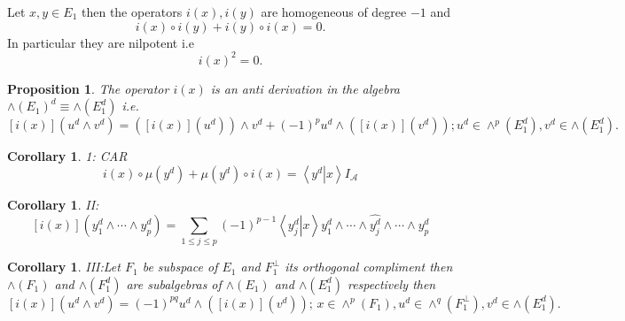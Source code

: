 \documentclass[aps,preprint]{revtex4}%
\newtheorem{corollary}[theorem]{Corollary}
\newtheorem{proposition}[theorem]{Proposition}
\begin{document}
Let $x,y\in E_{1}$ then the operators $i\left(  x\right)  ,i\left(  y\right)
$ are homogeneous of degree $-1$ and
\begin{equation}
i\left(  x\right)  \circ i\left(  y\right)  +i\left(  y\right)  \circ i\left(
x\right)  =0.
\end{equation}
In particular they are nilpotent i.e
\begin{equation}
i\left(  x\right)  ^{2}=0.
\end{equation}


\begin{proposition}
The operator $i\left(  x\right)  $ is an anti derivation in the algebra
$\wedge\left(  E_{1}\right)  ^{d}\equiv\wedge\left(  E_{1}^{d}\right)  $ i.e.
\begin{equation}
\left[  i\left(  x\right)  \right]  \left(  u^{d}\wedge v^{d}\right)  =\left(
\left[  i\left(  x\right)  \right]  \left(  u^{d}\right)  \right)  \wedge
v^{d}+\left(  -1\right)  ^{p}u^{d}\wedge\left(  \left[  i\left(  x\right)
\right]  \left(  v^{d}\right)  \right)  ;u^{d}\in\wedge^{p}\left(  E_{1}%
^{d}\right)  ,v^{d}\in\wedge\left(  E_{1}^{d}\right)  .
\end{equation}

\end{proposition}

\begin{corollary}
1: CAR%
\begin{equation}
i\left(  x\right)  \circ\mu\left(  y^{d}\right)  +\mu\left(  y^{d}\right)
\circ i\left(  x\right)  =\left\langle \left.  y^{d}\right\vert x\right\rangle
I_{\mathcal{A}}%
\end{equation}

\end{corollary}

\begin{corollary}
II:%
\begin{equation}
\left[  i\left(  x\right)  \right]  \left(  y_{1}^{d}\wedge\cdots\wedge
y_{p}^{d}\right)  =\sum_{1\leq j\leq p}\left(  -1\right)  ^{p-1}\left\langle
\left.  y_{j}^{d}\right\vert x\right\rangle y_{1}^{d}\wedge\cdots
\wedge\widehat{y_{j}^{d}}\wedge\cdots\wedge y_{p}^{d}%
\end{equation}

\end{corollary}

\begin{corollary}
III:Let $F_{1}$ be subspace of $E_{1}$ and $F_{1}^{\bot}$ its orthogonal
compliment then $\wedge\left(  F_{1}\right)  $ and $\wedge\left(  F_{1}%
^{d}\right)  $ are subalgebras of $\wedge\left(  E_{1}\right)  $ and
$\wedge\left(  E_{1}^{d}\right)  $ respectively then
\begin{equation}
\left[  i\left(  x\right)  \right]  \left(  u^{d}\wedge v^{d}\right)  =\left(
-1\right)  ^{pq}u^{d}\wedge\left(  \left[  i\left(  x\right)  \right]  \left(
v^{d}\right)  \right)  ;\,x\in\wedge^{p}\left(  F_{1}\right)  ,u^{d}\in
\wedge^{q}\left(  F_{1}^{\bot}\right)  ,v^{d}\in\wedge\left(  E_{1}%
^{d}\right)  .
\end{equation}

\end{corollary}
\end{document}
